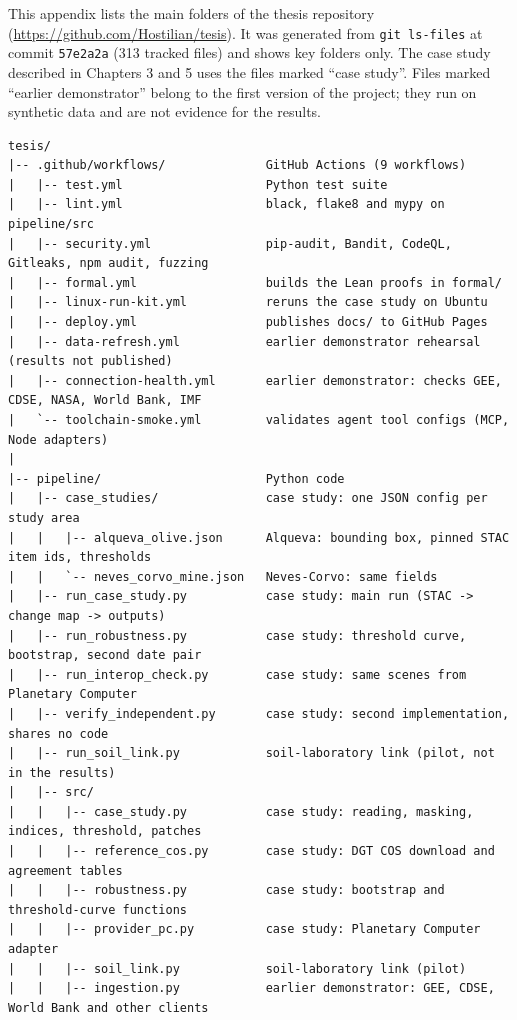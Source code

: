 

This appendix lists the main folders of the thesis repository (\url{https://github.com/Hostilian/tesis}). It was generated from \texttt{git ls-files} at commit \texttt{57e2a2a} (313 tracked files) and shows key folders only. The case study described in Chapters 3 and 5 uses the files marked ``case study''. Files marked ``earlier demonstrator'' belong to the first version of the project; they run on synthetic data and are not evidence for the results.

{\footnotesize
\begin{verbatim}
tesis/
|-- .github/workflows/              GitHub Actions (9 workflows)
|   |-- test.yml                    Python test suite
|   |-- lint.yml                    black, flake8 and mypy on pipeline/src
|   |-- security.yml                pip-audit, Bandit, CodeQL, Gitleaks, npm audit, fuzzing
|   |-- formal.yml                  builds the Lean proofs in formal/
|   |-- linux-run-kit.yml           reruns the case study on Ubuntu
|   |-- deploy.yml                  publishes docs/ to GitHub Pages
|   |-- data-refresh.yml            earlier demonstrator rehearsal (results not published)
|   |-- connection-health.yml       earlier demonstrator: checks GEE, CDSE, NASA, World Bank, IMF
|   `-- toolchain-smoke.yml         validates agent tool configs (MCP, Node adapters)
|
|-- pipeline/                       Python code
|   |-- case_studies/               case study: one JSON config per study area
|   |   |-- alqueva_olive.json      Alqueva: bounding box, pinned STAC item ids, thresholds
|   |   `-- neves_corvo_mine.json   Neves-Corvo: same fields
|   |-- run_case_study.py           case study: main run (STAC -> change map -> outputs)
|   |-- run_robustness.py           case study: threshold curve, bootstrap, second date pair
|   |-- run_interop_check.py        case study: same scenes from Planetary Computer
|   |-- verify_independent.py       case study: second implementation, shares no code
|   |-- run_soil_link.py            soil-laboratory link (pilot, not in the results)
|   |-- src/
|   |   |-- case_study.py           case study: reading, masking, indices, threshold, patches
|   |   |-- reference_cos.py        case study: DGT COS download and agreement tables
|   |   |-- robustness.py           case study: bootstrap and threshold-curve functions
|   |   |-- provider_pc.py          case study: Planetary Computer adapter
|   |   |-- soil_link.py            soil-laboratory link (pilot)
|   |   |-- ingestion.py            earlier demonstrator: GEE, CDSE, World Bank and other clients

\end{verbatim}}
